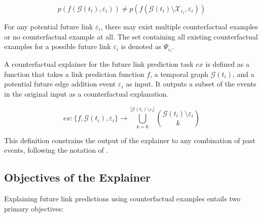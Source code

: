 \begin{equation}
    \label{e_CFExplanation}
    p(f(\mathcal{G}(t_i), \varepsilon_{i})) \neq p(f(\mathcal{G}(t_i) \setminus \mathcal{X}_{\varepsilon_i}, \varepsilon_{i}))
\end{equation}

For any potential future link $\varepsilon_{i}$, there may exist multiple counterfactual examples or no counterfactual example at all. The set containing all existing counterfactual examples for a possible future link $\varepsilon_{i}$ is denoted as $\Psi_{\varepsilon_i}$.

A counterfactual explainer for the future link prediction task $ex$ is defined as a function that takes a link prediction function $f$, a temporal graph $\mathcal{G}(t_i)$, and a potential future edge addition event $\varepsilon_i$ as input. It outputs a subset of the events in the original input as a counterfactual explanation.

\begin{equation}
    \label{e_Explainer}
    ex: \{f, \mathcal{G}(t_i), \varepsilon_i\} \rightarrow \bigcup_{k = 0}^{|\mathcal{G}(t_i) \setminus \varepsilon_i|} {\mathcal{G}(t_i) \setminus \varepsilon_i \choose k}
\end{equation}

This definition constrains the output of the explainer to any combination of past events, following the notation of \cite{stanley_enumerative_1986}.

\subsection{Objectives of the Explainer}
\label{s_ProblemFormulation_Objectives}

Explaining future link predictions using counterfactual examples entails two primary objectives:

